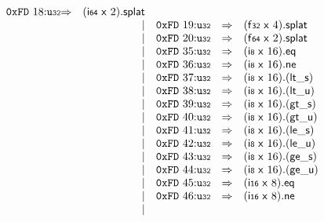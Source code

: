 $$\begin{array}{@{}l@{}rrlll@{}l@{}}
\mathtt{0xFD}~18{:}{\mathtt{u{\scriptstyle32}}} &\Rightarrow& (\mathsf{i{\scriptstyle64}}~\mathsf{x}~2).\mathsf{splat} \\ &&|&
\mathtt{0xFD}~19{:}{\mathtt{u{\scriptstyle32}}} &\Rightarrow& (\mathsf{f{\scriptstyle32}}~\mathsf{x}~4).\mathsf{splat} \\ &&|&
\mathtt{0xFD}~20{:}{\mathtt{u{\scriptstyle32}}} &\Rightarrow& (\mathsf{f{\scriptstyle64}}~\mathsf{x}~2).\mathsf{splat} \\ &&|&
\mathtt{0xFD}~35{:}{\mathtt{u{\scriptstyle32}}} &\Rightarrow& (\mathsf{i{\scriptstyle8}}~\mathsf{x}~16) . \mathsf{eq} \\ &&|&
\mathtt{0xFD}~36{:}{\mathtt{u{\scriptstyle32}}} &\Rightarrow& (\mathsf{i{\scriptstyle8}}~\mathsf{x}~16) . \mathsf{ne} \\ &&|&
\mathtt{0xFD}~37{:}{\mathtt{u{\scriptstyle32}}} &\Rightarrow& (\mathsf{i{\scriptstyle8}}~\mathsf{x}~16) . ({\mathsf{lt\_}}{\mathsf{s}}) \\ &&|&
\mathtt{0xFD}~38{:}{\mathtt{u{\scriptstyle32}}} &\Rightarrow& (\mathsf{i{\scriptstyle8}}~\mathsf{x}~16) . ({\mathsf{lt\_}}{\mathsf{u}}) \\ &&|&
\mathtt{0xFD}~39{:}{\mathtt{u{\scriptstyle32}}} &\Rightarrow& (\mathsf{i{\scriptstyle8}}~\mathsf{x}~16) . ({\mathsf{gt\_}}{\mathsf{s}}) \\ &&|&
\mathtt{0xFD}~40{:}{\mathtt{u{\scriptstyle32}}} &\Rightarrow& (\mathsf{i{\scriptstyle8}}~\mathsf{x}~16) . ({\mathsf{gt\_}}{\mathsf{u}}) \\ &&|&
\mathtt{0xFD}~41{:}{\mathtt{u{\scriptstyle32}}} &\Rightarrow& (\mathsf{i{\scriptstyle8}}~\mathsf{x}~16) . ({\mathsf{le\_}}{\mathsf{s}}) \\ &&|&
\mathtt{0xFD}~42{:}{\mathtt{u{\scriptstyle32}}} &\Rightarrow& (\mathsf{i{\scriptstyle8}}~\mathsf{x}~16) . ({\mathsf{le\_}}{\mathsf{u}}) \\ &&|&
\mathtt{0xFD}~43{:}{\mathtt{u{\scriptstyle32}}} &\Rightarrow& (\mathsf{i{\scriptstyle8}}~\mathsf{x}~16) . ({\mathsf{ge\_}}{\mathsf{s}}) \\ &&|&
\mathtt{0xFD}~44{:}{\mathtt{u{\scriptstyle32}}} &\Rightarrow& (\mathsf{i{\scriptstyle8}}~\mathsf{x}~16) . ({\mathsf{ge\_}}{\mathsf{u}}) \\ &&|&
\mathtt{0xFD}~45{:}{\mathtt{u{\scriptstyle32}}} &\Rightarrow& (\mathsf{i{\scriptstyle16}}~\mathsf{x}~8) . \mathsf{eq} \\ &&|&
\mathtt{0xFD}~46{:}{\mathtt{u{\scriptstyle32}}} &\Rightarrow& (\mathsf{i{\scriptstyle16}}~\mathsf{x}~8) . \mathsf{ne} \\ &&|&

\end{array}$$
